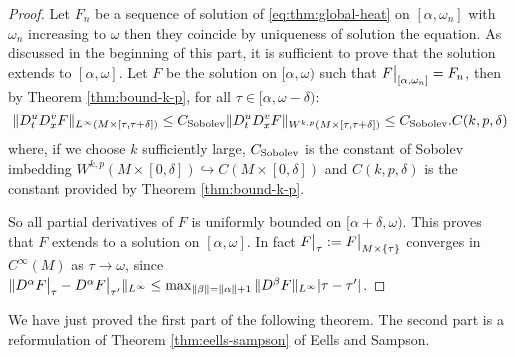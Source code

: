 \begin{proof}
Let \(F_n\) be a sequence of solution of \eqref{eq:thm:global-heat} on \([\alpha,\omega_n]\) with \(\omega_n\) increasing to \(\omega\) then they coincide by
uniqueness of solution the equation. As discussed in the beginning of this part, it is
sufficient to prove that the solution extends to \([\alpha,\omega]\). Let \(F\) be the
solution on \([\alpha,\omega)\) such that \(\restr{F}{[\alpha,\omega_n]} = F_n\), then
by Theorem \ref{thm:bound-k-p}, for all \(\tau \in [\alpha,\omega-\delta)\):
\[
 \| D^u_t D^v_x F \|_{L^\infty(M\times[\tau,\tau+\delta])} \leq C_{\rm Sobolev} \| D^u_t D^v_x F
\|_{W^{k,p}(M\times[\tau,\tau+\delta])} \leq C_{\rm Sobolev} . C(k,p,\delta)
\]
where, if we choose \(k\) sufficiently large, \(C_{\rm Sobolev}\) is the constant of Sobolev imbedding \(W^{k,p}(M\times[0,\delta]) \hookrightarrow C(M\times[0,\delta])\) and \(C(k,p,\delta)\)
is the constant provided by Theorem \ref{thm:bound-k-p}. 

So all partial derivatives of \(F\) is uniformly bounded on \([\alpha +\delta,\omega)\). This proves that \(F\) extends
to a solution on \([\alpha,\omega]\). In fact \(\restr{F}{\tau}:=\restr{F}{M\times\{\tau\}}\) converges
in \(C^\infty(M)\) as \(\tau\to \omega\), since \(\|D^\alpha \restr{F}{\tau} -
D^\alpha\restr{F}{\tau'}\|_{L^\infty} \leq \max_{\|\beta\| = \|\alpha\|+1}\|D^{\beta}F\|_{L^\infty}|\tau-\tau'|\).
\end{proof}

We have just proved the first part of the following theorem. The second part is a
reformulation of Theorem \ref{thm:eells-sampson}
of Eells and Sampson.

